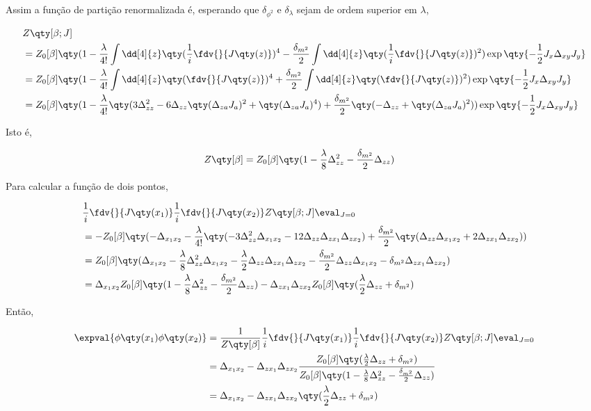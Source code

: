 \documentclass[twoside]{amsart}
\numberwithin{equation}{section}
\begin{document}
\begin{refsection}
Assim a função de partição renormalizada é, esperando que $\delta_{\phi^2}$ e $\delta_{\lambda}$ sejam de ordem superior em $\lambda$,

\begin{align}
    &Z\qty[\beta; J]\\
    &=Z_0[\beta]\qty(1-\frac{\lambda}{4!}\int\dd[4]{z}\qty(\frac{1}{i}\fdv{}{J\qty(z)})^4-\frac{\delta_{m^2}}{2}\int\dd[4]{z}\qty(\frac1i\fdv{}{J\qty(z)})^2)\exp\qty{-\frac12J_x\Delta_{xy}J_y}\\
    &=Z_0[\beta]\qty(1-\frac{\lambda}{4!}\int\dd[4]{z}\qty(\fdv{}{J\qty(z)})^4+\frac{\delta_{m^2}}{2}\int\dd[4]{z}\qty(\fdv{}{J\qty(z)})^2)\exp\qty{-\frac12J_x\Delta_{xy}J_y}\\
    &=Z_0[\beta]\qty(1-\frac{\lambda}{4!}\qty(3\Delta^2_{zz}-6\Delta_{zz}\qty(\Delta_{za}J_a)^2+\qty(\Delta_{za}J_a)^4)+\frac{\delta_{m^2}}{2}\qty(-\Delta_{zz}+\qty(\Delta_{za}J_a)^2))\exp\qty{-\frac12J_x\Delta_{xy}J_y}
\end{align}

Isto é,

\begin{align}
    Z\qty[\beta]&=Z_0[\beta]\qty(1-\frac{\lambda}{8}\Delta^2_{zz}-\frac{\delta_{m^2}}{2}\Delta_{zz})  
\end{align}

Para calcular a função de dois pontos,

\begin{align}
    &\frac1i\fdv{}{J\qty(x_1)}\frac1i\fdv{}{J\qty(x_2)}Z\qty[\beta; J]\eval_{J=0}\\
    &=-Z_0[\beta]\qty(-\Delta_{x_1x_2}-\frac{\lambda}{4!}\qty(-3\Delta^2_{zz}\Delta_{x_1x_2}-12\Delta_{zz}\Delta_{zx_1}\Delta_{zx_2})+\frac{\delta_{m^2}}{2}\qty(\Delta_{zz}\Delta_{x_1x_2}+2\Delta_{zx_1}\Delta_{zx_2}))\\
    &=Z_0[\beta]\qty(\Delta_{x_1x_2}-\frac{\lambda}{8}\Delta^2_{zz}\Delta_{x_1x_2}-\frac{\lambda}{2}\Delta_{zz}\Delta_{zx_1}\Delta_{zx_2}-\frac{\delta_{m^2}}{2}\Delta_{zz}\Delta_{x_1x_2}-\delta_{m^2}\Delta_{zx_1}\Delta_{zx_2})\\
    &=\Delta_{x_1x_2}Z_0[\beta]\qty(1-\frac{\lambda}{8}\Delta^2_{zz}-\frac{\delta_{m^2}}{2}\Delta_{zz})-\Delta_{zx_1}\Delta_{zx_2}Z_0[\beta]\qty(\frac\lambda2\Delta_{zz}+\delta_{m^2})
\end{align}

Então,

\begin{align}
    \expval{\phi\qty(x_1)\phi\qty(x_2)}&=\frac{1}{Z\qty[\beta]}\frac1i\fdv{}{J\qty(x_1)}\frac1i\fdv{}{J\qty(x_2)}Z\qty[\beta; J]\eval_{J=0}\\
    &=\Delta_{x_1x_2}-\Delta_{zx_1}\Delta_{zx_2}\frac{Z_0[\beta]\qty(\frac\lambda2\Delta_{zz}+\delta_{m^2})}{Z_0[\beta]\qty(1-\frac{\lambda}{8}\Delta^2_{zz}-\frac{\delta_{m^2}}{2}\Delta_{zz})  }\\
    &=\Delta_{x_1x_2}-\Delta_{zx_1}\Delta_{zx_2}\qty(\frac\lambda2\Delta_{zz}+\delta_{m^2})
\end{align}


\end{refsection}
\end{document}
